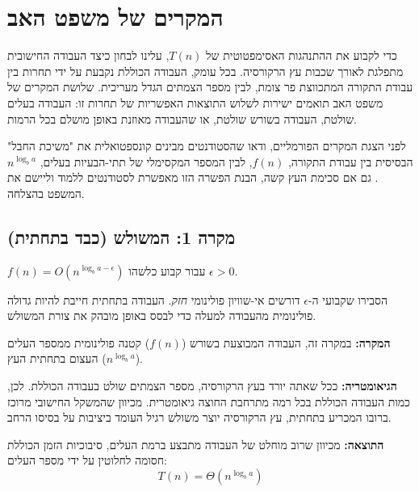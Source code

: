 \documentclass[11pt, a4paper]{article}
\begin{document}
\section*{המקרים של משפט האב}
כדי לקבוע את ההתנהגות האסימפטוטית של $T(n)$, עלינו לבחון כיצד העבודה החישובית מתפלגת לאורך שכבות עץ הרקורסיה. בכל עומק, העבודה הכוללת נקבעת על ידי תחרות בין עבודת התקורה המתכווצת פר צומת, לבין מספר הצמתים הגדל מעריכית. שלושת המקרים של משפט האב תואמים ישירות לשלוש התוצאות האפשריות של תחרות זו: העבודה בעלים שולטת, העבודה בשורש שולטת, או שהעבודה מאוזנת באופן מושלם בכל הרמות.

\vspace{0.3cm}
\begin{educatortip}
לפני הצגת המקרים הפורמליים, ודאו שהסטודנטים מבינים קונספטואלית את "משיכת החבל" הבסיסית בין עבודת התקורה, $f(n)$, לבין המספר המקסימלי של תתי-הבעיות בעלים, $n^{\log_b a}$. גם אם סכימת העץ קשה, הבנת הפשרה הזו מאפשרת לסטודנטים ללמוד וליישם את המשפט בהצלחה.
\end{educatortip}

\vspace{0.5cm}
\subsection*{מקרה 1: המשולש (כבד בתחתית)}

\begin{tcolorbox}[colback=accent1!10, colframe=accent1, title=\textbf{התנאי}]
$f(n) = O(n^{\log_b a - \epsilon})$ עבור קבוע כלשהו $\epsilon > 0$.
\end{tcolorbox}
\begin{educatortip}
הסבירו שקבועי ה-$\epsilon$ דורשים אי-שוויון פולינומי \textit{חזק}. העבודה בתחתית חייבת להיות גדולה פולינומית מהעבודה למעלה כדי לבסס באופן מובהק את צורת המשולש.
\end{educatortip}
\textbf{המקרה:} במקרה זה, העבודה המבוצעת בשורש ($f(n)$) קטנה פולינומית ממספר העלים העצום בתחתית העץ ($n^{\log_b a}$).

\textbf{הגיאומטריה:} ככל שאתה יורד בעץ הרקורסיה, מספר הצמתים שולט בעבודה הכוללת. לכן, כמות העבודה הכוללת בכל רמה מתרחבת החוצה גיאומטרית. מכיוון שהמשקל החישובי מרוכז ברובו המכריע בתחתית, עץ הרקורסיה יוצר משולש רגיל העומד ביציבות על בסיסו הרחב.

\textbf{התוצאה:} מכיוון שרוב מוחלט של העבודה מתבצע ברמת העלים, סיבוכיות הזמן הכוללת חסומה לחלוטין על ידי מספר העלים:
\begin{equation*}
    T(n) = \Theta(n^{\log_b a})
\end{equation*}
\end{document}
